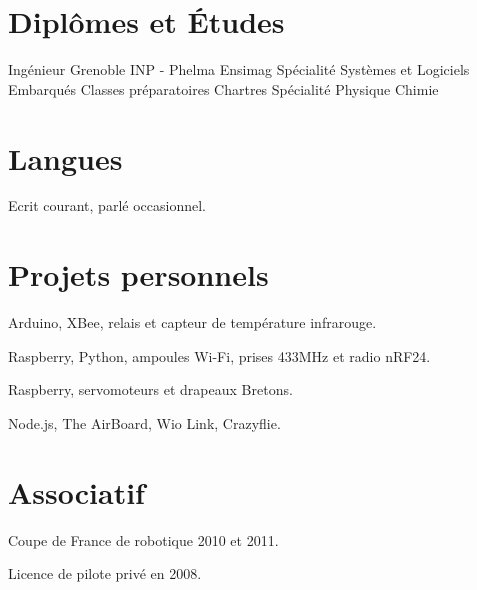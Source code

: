 \documentclass[10pt,a4paper]{moderncv}
\begin{document}
\section{Diplômes et Études}

  {Ingénieur Grenoble INP - Phelma Ensimag}
  {}
  {}
  {}
  {Spécialité Systèmes et Logiciels Embarqués\newline{}}
  {Classes préparatoires}
  {}
  {}
  {Chartres}
  {Spécialité Physique Chimie\newline{}}

\section{Langues}

  {\small Ecrit courant, parlé occasionnel.\newline{}}

\section{Projets personnels}

  {\small Arduino, XBee, relais et capteur de température infrarouge.}
  
  {\small Raspberry, Python, ampoules Wi-Fi, prises 433MHz et radio nRF24.}
  
  {\small Raspberry, servomoteurs et drapeaux Bretons.}

  {\small Node.js, The AirBoard, Wio Link, Crazyflie.\newline{}}

\section{Associatif}

  {\small Coupe de France de robotique 2010 et 2011.}

  {\small Licence de pilote privé en 2008.\newline{}}
  
  
\end{document}
